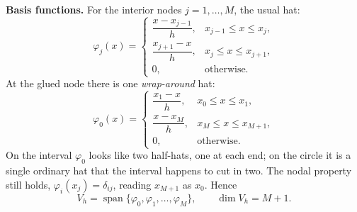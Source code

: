 \documentclass[11pt]{article}
\begin{document}
\medskip
\textbf{Basis functions.} For the interior nodes $j=1,\dots,M$, the usual hat:
\begin{equation}\label{eq:hat}
  \varphi_j(x)=
  \begin{cases}
    \dfrac{x-x_{j-1}}{h}, & x_{j-1}\le x\le x_j,\\[2ex]
    \dfrac{x_{j+1}-x}{h}, & x_j\le x\le x_{j+1},\\[1.2ex]
    0, & \text{otherwise.}
  \end{cases}
\end{equation}
At the glued node there is one \emph{wrap-around} hat:
\begin{equation}\label{eq:hat0}
  \varphi_0(x)=
  \begin{cases}
    \dfrac{x_1-x}{h}, & x_0\le x\le x_1,\\[2ex]
    \dfrac{x-x_M}{h}, & x_M\le x\le x_{M+1},\\[1.2ex]
    0, & \text{otherwise.}
  \end{cases}
\end{equation}
On the interval $\varphi_0$ looks like two half-hats, one at each end; on the
circle it is a single ordinary hat that the interval happens to cut in two. The
nodal property still holds, $\varphi_i(x_j)=\delta_{ij}$, reading $x_{M+1}$ as
$x_0$. Hence
\begin{equation}\label{eq:span}
  V_h=\operatorname{span}\{\varphi_0,\varphi_1,\dots,\varphi_M\},
  \qquad \dim V_h=M+1 .
\end{equation}
\end{document}
